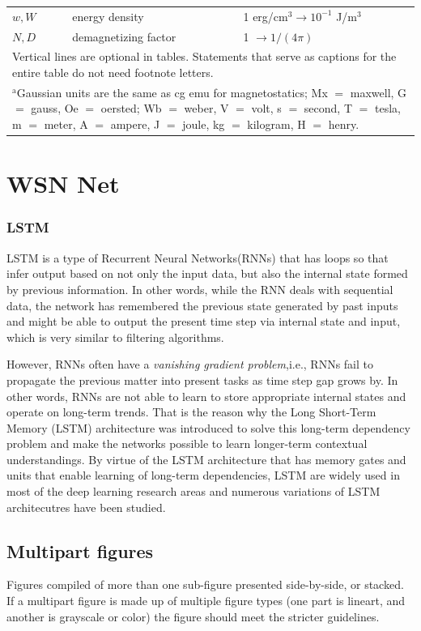 \documentclass{ieeeaccess}
\begin{document}
\begin{table}
\begin{tabular}{|p{25pt}|p{75pt}|p{115pt}|}
$w, W$& 
energy density& 
1 erg/cm$^{3} \to  10^{-1}$ J/m$^{3}$ \\
$N, D$& 
demagnetizing factor& 
1 $\to  1/(4\pi )$ \\
\hline
\multicolumn{3}{p{251pt}}{Vertical lines are optional in tables. Statements that serve as captions for 
the entire table do not need footnote letters. }\\
\multicolumn{3}{p{251pt}}{$^{\mathrm{a}}$Gaussian units are the same as cg emu for magnetostatics; Mx 
$=$ maxwell, G $=$ gauss, Oe $=$ oersted; Wb $=$ weber, V $=$ volt, s $=$ 
second, T $=$ tesla, m $=$ meter, A $=$ ampere, J $=$ joule, kg $=$ 
kilogram, H $=$ henry.}
\end{tabular}
\label{tab1}
\end{table}


\section{WSN Net}

\subsubsection{LSTM}

LSTM is a type of Recurrent Neural Networks(RNNs) that has loops so that infer output based on not only the input data, but also the internal state formed by previous information. In other words, while the RNN deals with sequential data, the network has remembered the previous state generated by past inputs and might be able to output the present time step via internal state and input, which is very similar to filtering algorithms.

However, RNNs often have a \textit{vanishing gradient problem},i.e., RNNs fail to propagate the previous matter into present tasks as time step gap grows by. In other words, RNNs are not able to learn to store appropriate internal states and operate on long-term trends. That is the reason why the Long Short-Term Memory (LSTM) architecture was introduced to solve this long-term dependency problem and make the networks possible to learn longer-term contextual understandings\cite{hochreiter1997long}.
By virtue of the LSTM architecture that has memory gates and units that enable learning of long-term dependencies\cite{zaremba2014learning}, LSTM are widely used in most of the deep learning research areas and numerous variations of LSTM architecutres have been studied.

\subsection{Multipart figures}
Figures compiled of more than one sub-figure presented side-by-side, or 
stacked. If a multipart figure is made up of multiple figure
types (one part is lineart, and another is grayscale or color) the figure 
should meet the stricter guidelines.
\end{document}
